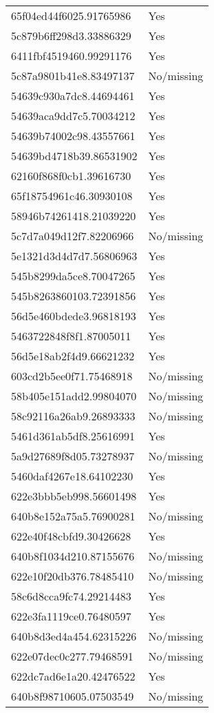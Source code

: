 \begin{tabular}{ll}
65f04ed44f6025.91765986 & Yes \\
5c879b6ff298d3.33886329 & Yes \\
6411fbf4519460.99291176 & Yes \\
5c87a9801b41e8.83497137 & No/missing \\
54639c930a7dc8.44694461 & Yes \\
54639aca9dd7c5.70034212 & Yes \\
54639b74002c98.43557661 & Yes \\
54639bd4718b39.86531902 & Yes \\
62160f868f0cb1.39616730 & Yes \\
65f18754961c46.30930108 & Yes \\
58946b74261418.21039220 & Yes \\
5c7d7a049d12f7.82206966 & No/missing \\
5e1321d3d4d7d7.56806963 & Yes \\
545b8299da5ce8.70047265 & Yes \\
545b8263860103.72391856 & Yes \\
56d5e460bdede3.96818193 & Yes \\
5463722848f8f1.87005011 & Yes \\
56d5e18ab2f4d9.66621232 & Yes \\
603cd2b5ee0f71.75468918 & No/missing \\
58b405e151add2.99804070 & No/missing \\
58c92116a26ab9.26893333 & No/missing \\
5461d361ab5df8.25616991 & Yes \\
5a9d27689f8d05.73278937 & No/missing \\
5460daf4267e18.64102230 & Yes \\
622e3bbb5eb998.56601498 & Yes \\
640b8e152a75a5.76900281 & No/missing \\
622e40f48cbfd9.30426628 & Yes \\
640b8f1034d210.87155676 & No/missing \\
622e10f20db376.78485410 & No/missing \\
58c6d8cca9fc74.29214483 & Yes \\
622e3fa1119ce0.76480597 & Yes \\
640b8d3ed4a454.62315226 & No/missing \\
622e07dec0c277.79468591 & No/missing \\
622dc7ad6e1a20.42476522 & Yes \\
640b8f98710605.07503549 & No/missing \\

\end{tabular}
